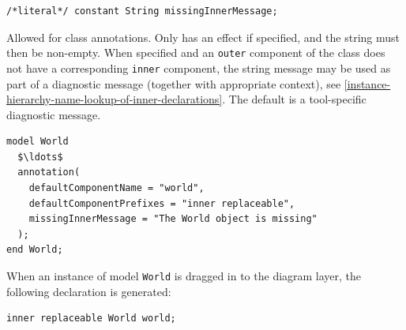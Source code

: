 \begin{annotationdefinition}[missingInnerMessage]
\begin{synopsis}\begin{lstlisting}
/*literal*/ constant String missingInnerMessage;
\end{lstlisting}\end{synopsis}
\begin{semantics}
Allowed for class annotations.
Only has an effect if specified, and the string must then be non-empty.
When specified and an \lstinline!outer! component of the class does not have a corresponding \lstinline!inner! component, the string message may be used as part of a diagnostic message (together with appropriate context), see \cref{instance-hierarchy-name-lookup-of-inner-declarations}.
The default is a tool-specific diagnostic message.

\begin{example}
\begin{lstlisting}[language=modelica]
model World
  $\ldots$
  annotation(
    defaultComponentName = "world",
    defaultComponentPrefixes = "inner replaceable",
    missingInnerMessage = "The World object is missing"
  );
end World;
\end{lstlisting}
When an instance of model \lstinline!World! is dragged in to the diagram layer, the following declaration is generated:
\begin{lstlisting}[language=modelica]
inner replaceable World world;
\end{lstlisting}
\end{example}
\end{semantics}
\end{annotationdefinition}

